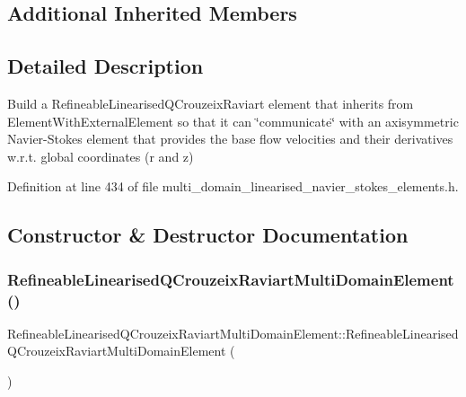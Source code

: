 \subsection*{Additional Inherited Members}


\subsection{Detailed Description}
Build a Refineable\+Linearised\+Q\+Crouzeix\+Raviart element that inherits from Element\+With\+External\+Element so that it can \char`\"{}communicate\char`\"{} with an axisymmetric Navier-\/\+Stokes element that provides the base flow velocities and their derivatives w.\+r.\+t. global coordinates (r and z) 

Definition at line 434 of file multi\+\_\+domain\+\_\+linearised\+\_\+navier\+\_\+stokes\+\_\+elements.\+h.



\subsection{Constructor \& Destructor Documentation}
\mbox{\label{classRefineableLinearisedQCrouzeixRaviartMultiDomainElement_aabc360f4d407c9dc644e0e4d4ec3e5cc}} 
\subsubsection{\texorpdfstring{Refineable\+Linearised\+Q\+Crouzeix\+Raviart\+Multi\+Domain\+Element()}{RefineableLinearisedQCrouzeixRaviartMultiDomainElement()}}
{\footnotesize\ttfamily Refineable\+Linearised\+Q\+Crouzeix\+Raviart\+Multi\+Domain\+Element\+::\+Refineable\+Linearised\+Q\+Crouzeix\+Raviart\+Multi\+Domain\+Element (\begin{DoxyParamCaption}{ }\end{DoxyParamCaption})\hspace{0.3cm}{\ttfamily [inline]}}



